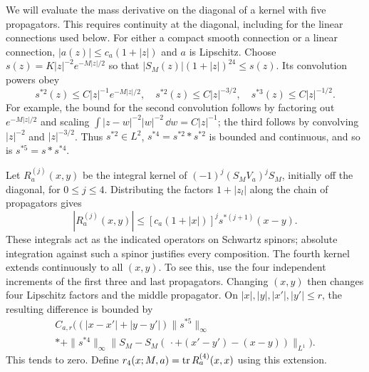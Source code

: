 We will evaluate the mass derivative on the diagonal of a kernel with
five propagators. This requires continuity at the diagonal, including
for the linear connections used below. For either a compact smooth
connection or a linear connection, $|a(z)|\le c_a(1+|z|)$ and
$a$ is Lipschitz. Choose
$s(z)=K|z|^{-2}e^{-M|z|/2}$ so that
$|S_M(z)|(1+|z|)^{24}\le s(z)$. Its convolution powers obey
\begin{equation}\label{eq:probe-convolutions}
 s^{*2}(z)\le C|z|^{-1}e^{-M|z|/2},\quad
 s^{*2}(z)\le C|z|^{-3/2},\quad
 s^{*3}(z)\le C|z|^{-1/2}.
\end{equation}
For example, the bound for the second convolution follows by factoring
out $e^{-M|z|/2}$ and scaling
$\int|z-w|^{-2}|w|^{-2}\,\dd w=C|z|^{-1}$; the third follows by
convolving $|z|^{-2}$ and $|z|^{-3/2}$. Thus $s^{*2}\in L^2$,
$s^{*4}=s^{*2}*s^{*2}$ is bounded and continuous, and so is
$s^{*5}=s*s^{*4}$.

Let $R_a^{(j)}(x,y)$ be the integral kernel of
$(-1)^j(S_MV_a)^jS_M$, initially off the diagonal, for $0\le j\le4$.
Distributing the factors $1+|z_l|$ along the chain of propagators gives
\begin{equation}\label{eq:probe-kernel-majorant}
 |R_a^{(j)}(x,y)|\le[c_a(1+|x|)]^j s^{*(j+1)}(x-y).
\end{equation}
These integrals act as the indicated operators on Schwartz spinors;
absolute integration against such a spinor justifies every composition.
The fourth kernel extends continuously to all $(x,y)$. To see this,
use the four independent increments of the first three and last
propagators. Changing $(x,y)$ then changes four Lipschitz factors and
the middle propagator. On $|x|,|y|,|x'|,|y'|\le r$, the resulting
difference is bounded by
\begin{multline}\label{eq:probe-kernel-continuity}
 C_{a,r}\bigl((|x-x'|+|y-y'|)\|s^{*5}\|_\infty\\*
 +\|s^{*4}\|_\infty
       \|S_M-S_M(\,\cdot+(x'-y')-(x-y))\|_{L^1}\bigr).
\end{multline}
This tends to zero. Define
$r_4(x;M,a)=\operatorname{tr} R_a^{(4)}(x,x)$ using this extension.

